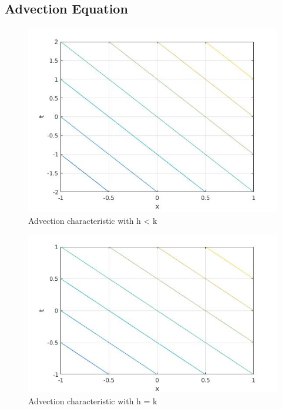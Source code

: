 \subsection{Advection Equation} \label{advcoordimg}
\begin{figure}[H]
 \includegraphics[width=\textwidth]{Images/advection_h<k.jpg}
 \caption{Advection characteristic with h < k}
\end{figure}
\begin{figure}[H]
 \includegraphics[width=\textwidth]{Images/advection_h=k.jpg}
 \caption{Advection characteristic with h = k}
\end{figure}
